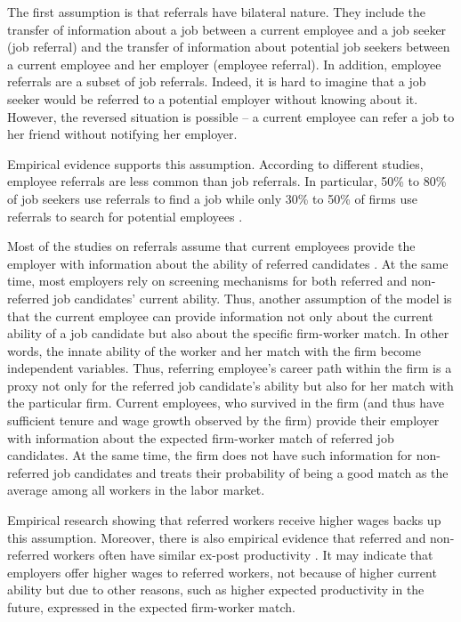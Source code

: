 \documentclass[12pt]{article}
\begin{document}
The first assumption is that referrals have bilateral nature. They include the transfer of information about a job between a current employee and a job seeker (job referral) and the transfer of information about potential job seekers between a current employee and her employer (employee referral). In addition, employee referrals are a subset of job referrals. Indeed, it is hard to imagine that a job seeker would be referred to a potential employer without knowing about it. However, the reversed situation is possible – a current employee can refer a job to her friend without notifying her employer. 

Empirical evidence supports this assumption. According to different studies, employee referrals are less common than job referrals. In particular,  50\% to 80\% of job seekers use referrals to find a job  \citep{lin1981social, elliott1999social} while only 30\% to 50\% of firms use referrals to search for potential employees \citep{neckerman1991hiring, holzer1987hiring}.

Most of the studies on referrals assume that current employees provide the employer with information about the ability of referred candidates \citep{lester2021heterogeneous, ekinci2016employee, beaman2012gets}. At the same time, most employers rely on screening mechanisms for both referred and non-referred job candidates' current ability. Thus, another assumption of the model is that the current employee can provide information not only about the current ability of a job candidate but also about the specific firm-worker match. In other words, the innate ability of the worker and her match with the firm become independent variables. Thus, referring employee’s career path within the firm is a proxy not only for the referred job candidate’s ability but also for her match with the particular firm. Current employees, who survived in the firm (and thus have sufficient tenure and wage growth observed by the firm) provide their employer with information about the expected firm-worker match of referred job candidates. At the same time, the firm does not have such information for non-referred job candidates and treats their probability of being a good match as the average among all workers in the labor market. 

Empirical research showing that referred workers receive higher wages backs up this assumption. Moreover, there is also empirical evidence that referred and non-referred workers often have similar ex-post productivity \citep{brown2016informal}. It may indicate that employers offer higher wages to referred workers, not because of higher current ability but due to other reasons, such as higher expected productivity in the future, expressed in the expected firm-worker match.
\end{document}

